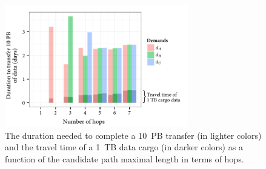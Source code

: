 \begin{figure}
    \includegraphics[width=8cm]{results/plot-france-3-transfers-duration.pdf}
    \caption{The duration needed to complete a 10~PB transfer (in lighter colors) and the travel time of a 1~TB data cargo (in darker colors) as a function of the candidate path maximal length in terms of hops.}
    \label{fig:hops-3-transfers-duration}
\end{figure}
